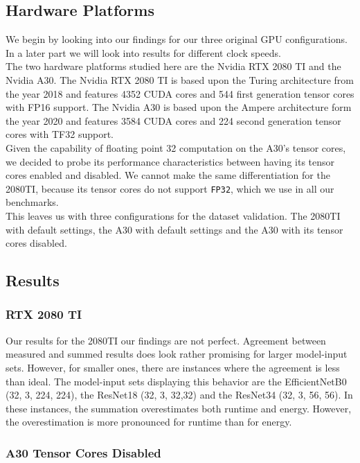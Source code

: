 \subsection{Hardware Platforms}
We begin by looking into our findings for our three original GPU configurations. In a later part we will look into results for different clock speeds.\\
The two hardware platforms studied here are the Nvidia RTX 2080 TI and the Nvidia A30. The Nvidia RTX 2080 TI is based upon the Turing architecture from the year 2018 and features 4352 CUDA cores and 544 first generation tensor cores with FP16 support. The Nvidia A30 is based upon the Ampere architecture form the year 2020 and features 3584 CUDA cores and 224 second generation tensor cores with TF32 support.\\
Given the capability of floating point 32 computation on the A30's tensor cores, we decided to probe its performance characteristics between having its tensor cores enabled and disabled. We cannot make the same differentiation for the 2080TI, because its tensor cores do not support \texttt{FP32}, which we use in all our benchmarks. \\
This leaves us with three configurations for the dataset validation. The 2080TI with default settings, the A30 with default settings and the A30 with its tensor cores disabled.


\subsection{Results}

\subsubsection{RTX 2080 TI}
Our results for the 2080TI our findings are not perfect. Agreement between measured and summed results does look rather promising for larger model-input sets. However, for smaller ones, there are instances where the agreement is less than ideal. The model-input sets displaying this behavior are the EfficientNetB0 (32, 3, 224, 224), the ResNet18 (32, 3, 32,32) and the ResNet34 (32, 3, 56, 56). In these instances, the summation overestimates both runtime and energy. However, the overestimation is more pronounced for runtime than for energy.
 

\subsubsection{A30 Tensor Cores Disabled}

